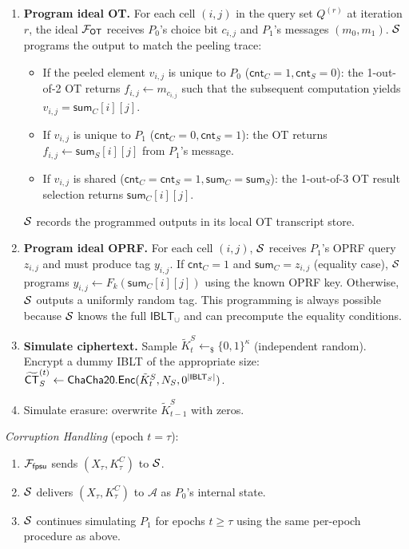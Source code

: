 \documentclass[letterpaper,twocolumn,10pt]{article}
\theoremstyle{definition}
\newcommand{\cA}{\mathcal{A}}\newcommand{\cB}{\mathcal{B}}\newcommand{\cZ}{\mathcal{Z}}
\newcommand{\sample}{\leftarrow_{\$}}\newcommand{\concat}{\|}
\begin{document}
\begin{framed}
\begin{enumerate}
\item \textbf{Program ideal OT.} For each cell $(i,j)$ in the query set
$Q^{(r)}$ at iteration $r$, the ideal $\mathcal{F}_{\mathsf{OT}}$ receives $P_0$'s
choice bit $c_{i,j}$ and $P_1$'s messages $(m_0, m_1)$. $\mathcal{S}$ programs the
output to match the peeling trace:
\begin{itemize}
\item If the peeled element $v_{i,j}$ is unique to $P_0$
($\mathsf{cnt}_C = 1, \mathsf{cnt}_S = 0$): the 1-out-of-2 OT returns
$f_{i,j} \leftarrow m_{c_{i,j}}$ such that the subsequent computation
yields $v_{i,j} = \mathsf{sum}_C[i][j]$.
\item If $v_{i,j}$ is unique to $P_1$
($\mathsf{cnt}_C = 0, \mathsf{cnt}_S = 1$): the OT returns
$f_{i,j} \leftarrow \mathsf{sum}_S[i][j]$ from $P_1$'s message.
\item If $v_{i,j}$ is shared ($\mathsf{cnt}_C = \mathsf{cnt}_S = 1,
\mathsf{sum}_C = \mathsf{sum}_S$): the 1-out-of-3 OT result selection
returns $\mathsf{sum}_C[i][j]$.
\end{itemize}
$\mathcal{S}$ records the programmed outputs in its local OT transcript store.

\item \textbf{Program ideal OPRF.} For each cell $(i,j)$, $\mathcal{S}$ receives
$P_1$'s OPRF query $z_{i,j}$ and must produce tag $y_{i,j}$. If
$\mathsf{cnt}_C = 1$ and $\mathsf{sum}_C = z_{i,j}$ (equality case), $\mathcal{S}$
programs $y_{i,j} \leftarrow F_k(\mathsf{sum}_C[i][j])$ using the known
OPRF key. Otherwise, $\mathcal{S}$ outputs a uniformly random tag. This
programming is always possible because $\mathcal{S}$ knows the full
$\mathsf{IBLT}_\cup$ and can precompute the equality conditions.

\item \textbf{Simulate ciphertext.} Sample $\tilde{K}^S_t \sample
\{0,1\}^\kappa$ (independent random). Encrypt a dummy IBLT of the
appropriate size: $\widetilde{\mathsf{CT}}^{(t)}_S \leftarrow
\mathsf{ChaCha20}.\mathsf{Enc}(\tilde{K}^S_t, N_S, 0^{|\mathsf{IBLT}_S|})$.

\item Simulate erasure: overwrite $\tilde{K}^S_{t-1}$ with zeros.
\end{enumerate}

\smallskip\noindent\textit{Corruption Handling} (epoch $t = \tau$):
\begin{enumerate}
\item $\mathcal{F}_{\mathsf{fpsu}}$ sends $(X_\tau, K^C_\tau)$ to $\mathcal{S}$.
\item $\mathcal{S}$ delivers $(X_\tau, K^C_\tau)$ to $\cA$ as $P_0$'s internal
state.
\item $\mathcal{S}$ continues simulating $P_1$ for epochs $t \geq \tau$ using the
same per-epoch procedure as above.
\end{enumerate}
\end{framed}
\end{document}
